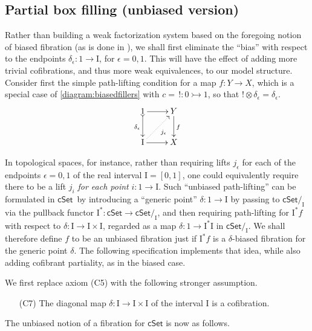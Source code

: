 \documentclass[11pt]{amsart}
\newcommand{\cSet}{\ensuremath{\mathsf{cSet}}}
\newcommand{\mono}{\ensuremath{\rightarrowtail}}
\newcommand{\ra}{\ensuremath{\rightarrow}}
\renewcommand{\to}{\ensuremath{\rightarrow}}
\newcommand{\I}{\ensuremath{\mathrm{I}}}
\theoremstyle{remark}
\theoremstyle{definition}
\begin{document}
\subsection{Partial box filling (unbiased version)}\label{subsec:unbiasedfibration}


Rather than building a weak factorization system based on the foregoing notion of biased fibration (as is done in \cite{GS}), we shall first eliminate the ``bias'' with respect to the endpoints $\delta_\epsilon : 1 \ra \I$, for $\epsilon = 0,1$.  This will have the effect of adding more trivial cofibrations, and thus more weak equivalences, to our model structure. Consider first the simple path-lifting condition for a map $f : Y \to X$, which is a special case of \eqref{diagram:biasedfillers} with $c =\, ! : 0\mono 1$, so that $!\otimes\delta_\epsilon = \delta_\epsilon$.
\begin{equation*}
\xymatrix{
1 \ar@{>->}[d]_{\delta_\epsilon} \ar[r] & Y \ar[d]^f \\
\I \ar@{.>}[ru]_{j_\epsilon} \ar[r] & X
}
\end{equation*}

In topological spaces, for instance, rather than requiring lifts $j_\epsilon$ for each of the endpoints $\epsilon = 0,1$  of the real interval $\I = [0,1]$, one could equivalently require there to be a lift $j_i$ \emph{for each point} $i: 1\ra\I$. Such ``unbiased path-lifting'' can be formulated in \cSet\ by introducing a ``generic point'' $\delta : 1\ra \I$ by passing to $\cSet/_\I$ via the pullback functor $\I^* : \cSet\to \cSet/_\I$, and then requiring path-lifting for $\I^*f$ with respect to $\delta : \I \to \I\times \I$, regarded as a map $\delta : 1\to\I^*{\I}$ in $\cSet/_\I$. We shall therefore define $f$ to be an unbiased fibration just if $\I^*f$ is a $\delta$-biased fibration for the generic point $\delta$.  The following specification implements that  idea, while also adding cofibrant partiality, as in the biased case.  

We first replace axiom (C5) with the following stronger assumption.
%
\begin{enumerate}
\item[(C7)] The diagonal map $\delta : \I\ra\I\times\I$ of the interval $\I$  is a cofibration.  
\end{enumerate}

The unbiased notion of a fibration for $\cSet$ is now as follows.
\end{document}
